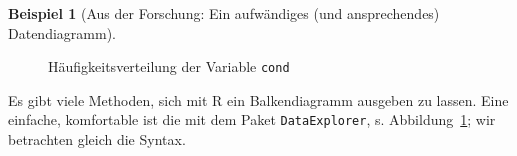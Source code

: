 \documentclass[
  a4paper,
]{scrbook}
\theoremstyle{definition}
\newtheorem{example}{Beispiel}[chapter]
\theoremstyle{definition}
\theoremstyle{definition}
\theoremstyle{remark}
\begin{document}
\begin{example}[Aus der Forschung: Ein aufwändiges (und ansprechendes)
Datendiagramm]
\begin{figure}
\begin{minipage}{0.50\linewidth}


\end{minipage}%
%
\begin{minipage}{0.50\linewidth}



\end{minipage}%

\caption{\label{fig-mario-n-plot-cond}Häufigkeitsverteilung der Variable
\texttt{cond}}

\end{figure}%

Es gibt viele Methoden, sich mit R ein Balkendiagramm ausgeben zu
lassen. Eine einfache, komfortable ist die mit dem Paket
\texttt{DataExplorer}, s. Abbildung~\ref{fig-mario-n-plot-cond}; wir
betrachten gleich die Syntax.


\end{example}
\end{document}
